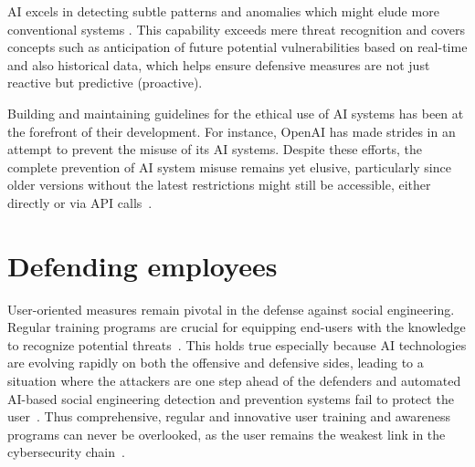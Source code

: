 
AI excels in detecting subtle patterns and anomalies which might elude more conventional systems \citep{fakhouri_AI_Driven_Solutions_SE_Attacks_2024}. This capability exceeds mere threat recognition and covers concepts such as anticipation of future potential vulnerabilities based on real-time and also historical data, which helps ensure defensive measures are not just reactive but predictive (proactive).


Building and maintaining guidelines for the ethical use of AI systems has been at the forefront of their development. For instance, OpenAI has made strides in an attempt to prevent the misuse of its AI systems. Despite these efforts, the complete prevention of AI system misuse remains yet elusive, particularly since older versions without the latest restrictions might still be accessible, either directly or via API calls~\citep{gupta_From_ChatGPT_to_ThreatGPT_2023}.

\section{Defending employees}
\begin{comment}
\end{comment}

User-oriented measures remain pivotal in the defense against social engineering. Regular training programs are crucial for equipping end-users with the knowledge to recognize potential threats~\citep{hadnagy_Social_Engineering_The_Science_2018}. This holds true especially because AI technologies are evolving rapidly on both the offensive and defensive sides, leading to a situation where the attackers are one step ahead of the defenders and automated AI-based social engineering detection and prevention systems fail to protect the user~\citep{fakhouri_AI_Driven_Solutions_SE_Attacks_2024}. Thus comprehensive, regular and innovative user training and awareness programs can never be overlooked, as the user remains the weakest link in the cybersecurity chain~\citep{mitnick_The_Art_of_Deception_2003}.

